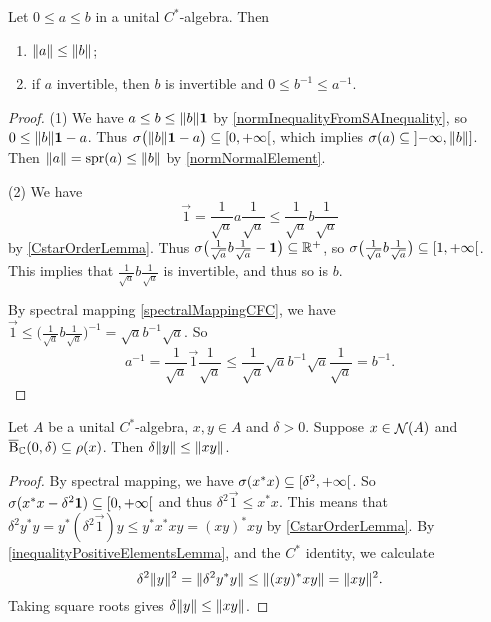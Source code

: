 \begin{lemma} \label{inequalityPositiveElementsLemma}
Let $0\leq a \leq b$ in a unital $C^*$-algebra. Then
\begin{enumerate}
\item $\lVert a\rVert \leq \lVert b\rVert$;
\item if $a$ invertible, then $b$ is invertible and $0\leq b^{-1} \leq a^{-1}$.
\end{enumerate}
\end{lemma}
\begin{proof}
(1) We have $a \leq b \leq \lVert b\rVert\boldsymbol{\mathrm{1}}$ by \ref{normInequalityFromSAInequality}, so $0\leq \lVert b\rVert\boldsymbol{\mathrm{1}} - a$. Thus $\spec\big(\norm{b}\vec{1} - a\big) \subseteq \interval[co]{0,+\infty}$, which implies $\spec(a) \subseteq \interval[oc]{-\infty, \norm{b}}$. Then $\lVert a\rVert = \operatorname{spr}(a) \leq \lVert b\rVert$ by \ref{normNormalElement}.

(2) We have
\[ \vec{1} = \frac{1}{\sqrt{a}}a\frac{1}{\sqrt{a}} \leq \frac{1}{\sqrt{a}}b\frac{1}{\sqrt{a}} \]
by \ref{CstarOrderLemma}. Thus $\sigma\big(\frac{1}{\sqrt{a}}b\frac{1}{\sqrt{a}} - \boldsymbol{\mathrm{1}}\big) \subseteq \mathbb{R}^+$, so $\spec\big(\frac{1}{\sqrt{a}}b\frac{1}{\sqrt{a}}\big) \subseteq \interval[co]{1,+\infty}$. This implies that $\frac{1}{\sqrt{a}}b\frac{1}{\sqrt{a}}$ is invertible, and thus so is $b$.

By spectral mapping \ref{spectralMappingCFC}, we have $\vec{1} \leq \big(\frac{1}{\sqrt{a}}b\frac{1}{\sqrt{a}}\big)^{-1} = \sqrt{a}b^{-1}\sqrt{a}$. So
\[ a^{-1} = \frac{1}{\sqrt{a}}\vec{1}\frac{1}{\sqrt{a}} \leq \frac{1}{\sqrt{a}}\sqrt{a}b^{-1}\sqrt{a}\frac{1}{\sqrt{a}} = b^{-1}. \]
\end{proof}

\begin{lemma}
Let $A$ be a unital $C^*$-algebra, $x,y\in A$ and $\delta > 0$. Suppose $x\in\mathop{\mathcal{N}}\nolimits(A)$ and $\operatorname{\overline{B}}_{\mathbb{C}}(0,\delta) \subseteq \rho(x)$. Then $\delta\lVert y\rVert \leq \lVert xy\rVert$.
\end{lemma}
\begin{proof}
By spectral mapping, we have $\spec(x^*x) \subseteq \interval[co]{\delta^2,+\infty}$. So $\spec(x^*x - \delta^2\vec{1}) \subseteq \interval[co]{0, +\infty}$ and thus $\delta^2\vec{1} \leq x^*x$. This means that $\delta^2y^*y = y^*(\delta^2\vec{1})y \leq y^*x^*xy = (xy)^*xy$ by \ref{CstarOrderLemma}. By \ref{inequalityPositiveElementsLemma}, and the $C^*$ identity, we calculate
\[ \delta^2\lVert y\rVert^2 = \lVert\delta^2y^*y\rVert \leq \lVert(xy)^*xy\rVert = \lVert xy\rVert^2. \]
Taking square roots gives $\delta\lVert y\rVert \leq \lVert xy\rVert$.
\end{proof}

